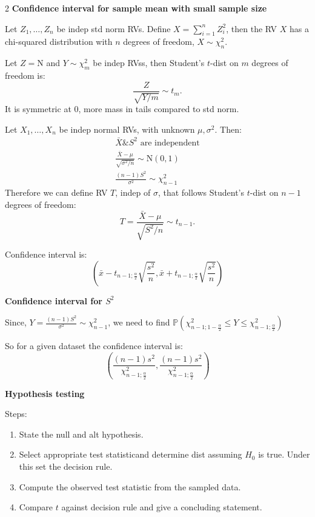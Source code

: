 \documentclass[10pt]{extarticle}
\theoremstyle{definition}
\theoremstyle{remark}
\newcommand{\pf}{\mathbb{P}}
\begin{document}
\begin{multicols}{2}
    \noindent
    \textbf{Confidence interval for sample mean with small sample size}

    Let $Z_1, \ldots, Z_n$ be indep std norm RVs. Define $X = \sum^n_{i=1} Z^2_i$, 
    then the RV $X$ has a chi-squared distribution with $n$ degrees of freedom, $X \sim \chi^2_n$.

    Let $Z = \text{N}$ and $Y \sim \chi^2_m$ be indep RVss, then Student's $t$-dist
    on $m$ degrees of freedom is: \[
        \frac{Z}{\sqrt{Y/m}} \sim t_m.
    \] It is symmetric at $0$, more mass in tails compared to std norm. 

    Let $X_1, \ldots, X_n$  be indep normal RVs, with unknown $\mu, \sigma^2$. Then: 
    \begin{gather*}
        \bar{X} \& S^2 \text{ are independent} \\
        \frac{\bar{X} - \mu}{\sqrt{\sigma^2 / n}} \sim \text{N}(0,1) \\
        \frac{(n-1)S^2}{\sigma^2} \sim \chi^2_{n-1}
    \end{gather*}
    Therefore we can define RV $T$, indep of $\sigma$, that follows Student's $t$-dist
    on $n-1$ degrees of freedom: \[
        T = \frac{\bar{X} - \mu}{\sqrt{S^2/n}} \sim t_{n-1}.
    \]

    Confidence interval is: \[
        \left( \bar{x} - t_{n-1 ; \frac{\alpha}{2}}\sqrt{\frac{s^2}{n}}, \bar{x} + t_{n-1 ; \frac{\alpha}{2}}\sqrt{\frac{s^2}{n}}\right)
    \]
    
    \noindent
    \textbf{Confidence interval for $S^2$}

    Since, $Y = \frac{(n-1)S^2}{\sigma^2} \sim \chi^2_{n-1}$, we need to find 
    $\pf\left( \chi^2_{n-1; 1- \frac{\alpha}{2}} \leq Y \leq \chi^2_{n-1; \frac{\alpha}{2}} \right)$

    So for a given dataset the confidence interval is: 
    \[ 
    \left( \frac{(n-1)s^2}{\chi^2_{n-1; \frac{\alpha}{2}}}, \frac{(n-1)s^2}{\chi^2_{n-1; \frac{\alpha}{2}}}\right)
    \]


    \noindent
    {\large\textbf{Hypothesis testing}}

    Steps: 
    \begin{enumerate}[noitemsep]
        \item State the null and alt hypothesis.
        \item Select appropriate test statisticand determine dist assuming $H_0$ is true. Under this set the decision rule.
        \item Compute the observed test statistic from the sampled data. 
        \item Compare $t$ against decision rule and give a concluding statement.
    \end{enumerate}


\end{multicols}
\end{document}
